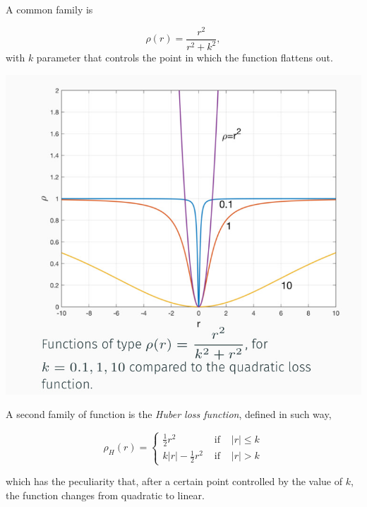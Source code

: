\documentclass[10pt]{report}
\begin{document}
A common family is

\[\rho(r) = \frac{r^2}{r^2 + k^2},\] with \(k\) parameter that controls
the point in which the function flattens out.

\begin{center}
\includegraphics[scale=0.32]{./pics/fit/m-estimators-k.jpg}
\end{center}

A second family of function is the \emph{Huber loss function}, defined in
such way,

\[ \rho_H(r) = \left\{ \begin{array}{lll} \frac{1}{2} r^2 & \mbox{ if } & |r| \leq k\\ k|r| - \frac{1}{2} r^2 & \mbox{ if } & |r| > k \end{array} \right. \]

which has the peculiarity that, after a certain point controlled by the
value of \(k\), the function changes from quadratic to linear.
\end{document}
